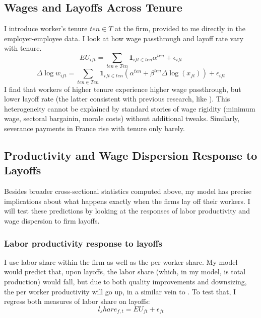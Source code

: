 \subsection*{Wages and Layoffs Across Tenure} %
I introduce worker's tenure $ten \in T$ at the firm, provided to me directly in the employer-employee data. I look at how wage passthrough and layoff rate vary with tenure.
\[ EU_{ift} = \sum_{ten \in Ten} \mathbf{1}_{ift \in ten}\alpha^{ten}  + \epsilon_{ift}\] 
\[ \Delta \log w_{ift} = \sum_{ten \in Ten} \mathbf{1}_{ift \in ten}(\alpha^{ten} + \beta^{ten}\Delta \log(x_{ft})) + \epsilon_{ift} \] 
I find that workers of higher tenure experience higher wage passthrough, but lower layoff rate (the latter consistent with previous research, like \textcite{buhai2014}). This heterogeneity cannot be explained by standard stories of wage rigidity (minimum wage, sectoral bargainin, morale costs) without additional tweaks. Similarly, severance payments in France rise with tenure only barely.
\subsection*{Productivity and Wage Dispersion Response to Layoffs}
 Besides broader cross-sectional statistics computed above, my model has precise implications about what happens exactly when the firms lay off their workers. I will test these predictions by looking at the responses of labor productivity and wage dispersion to firm layoffs.
\subsubsection*{Labor productivity response to layoffs} %
I use labor share within the firm as well as the per worker share. My model would predict that, upon layoffs, the labor share (which, in my model, is total production) would fall, but due to both quality improvements and downsizing, the per worker productivity will go up, in a similar vein to \textcite{berger2011}. To test that, I regress both measures of labor share on layoffs:
\[ l_share_{f,t} = EU_{ft} + \epsilon_{ft}\]

